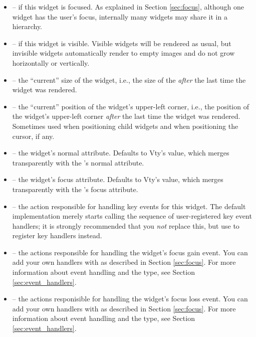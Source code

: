 \begin{itemize}
\item {} --  if this widget is focused.  As
  explained in Section \ref{sec:focus}, although one widget has the
  user's focus, internally many widgets may share it in a hierarchy.
\item {} --  if this widget is visible.  Visible
  widgets will be rendered as usual, but invisible widgets
  automatically render to empty images and do not grow horizontally or
  vertically.
\item {} -- the ``current'' size of the widget, i.e.,
  the size of the  \textit{after} the last time the widget
  was rendered.
\item {} -- the ``current'' position of the widget's
  upper-left corner, i.e., the position of the widget's upper-left
  corner \textit{after} the last time the widget was rendered.
  Sometimes used when positioning child widgets and when positioning
  the cursor, if any.
\item {} -- the widget's normal attribute.  Defaults
  to Vty's  value, which merges transparently with the
  's normal attribute.
\item {} -- the widget's focus attribute.  Defaults
  to Vty's  value, which merges transparently with the
  's focus attribute.
\item {} -- the action responsible for handling key
  events for this widget.  The default implementation merely starts
  calling the sequence of user-registered key event handlers; it is
  strongly recommended that you \textit{not} replace this, but use
   to register key handlers instead.
\item {} -- the actions responsible for handling
  the widget's focus gain event.  You can add your own handlers with
   as described in Section \ref{sec:focus}.  For more
  information about event handling and the  type, see
  Section \ref{sec:event_handlers}.
\item {} -- the actions responisible for handling
  the widget's focus loss event.  You can add your own handlers with
   as described in Section \ref{sec:focus}.  For more
  information about event handling and the  type, see
  Section \ref{sec:event_handlers}.
\end{itemize}

